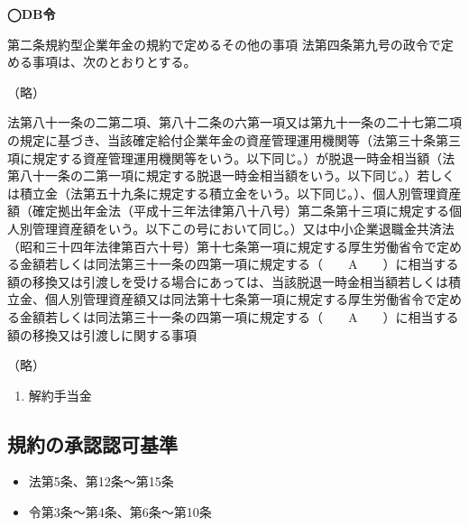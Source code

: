 \begin{fillblank}[年金2 \ 2018 \ 問題1(3)A]

  \noindent \textbf{◯DB令}
  \begin{lawstructure}
    \begin{lawarticle}{第二条}{規約型企業年金の規約で定めるその他の事項}
      法第四条第九号の政令で定める事項は、次のとおりとする。

      （略）

      法第八十一条の二第二項、第八十二条の六第一項又は第九十一条の二十七第二項の規定に基づき、当該確定給付企業年金の資産管理運用機関等（法第三十条第三項に規定する資産管理運用機関等をいう。以下同じ。）が脱退一時金相当額（法第八十一条の二第一項に規定する脱退一時金相当額をいう。以下同じ。）若しくは積立金（法第五十九条に規定する積立金をいう。以下同じ。）、個人別管理資産額（確定拠出年金法（平成十三年法律第八十八号）第二条第十三項に規定する個人別管理資産額をいう。以下この号において同じ。）又は中小企業退職金共済法（昭和三十四年法律第百六十号）第十七条第一項に規定する厚生労働省令で定める金額若しくは同法第三十一条の四第一項に規定する（　　A　　）に相当する額の移換又は引渡しを受ける場合にあっては、当該脱退一時金相当額若しくは積立金、個人別管理資産額又は同法第十七条第一項に規定する厚生労働省令で定める金額若しくは同法第三十一条の四第一項に規定する（　　A　　）に相当する額の移換又は引渡しに関する事項
      
      （略）
    \end{lawarticle}
  \end{lawstructure}

\end{fillblank}

\begin{answerbox}
 \begin{enumerate}[A:]
  \item 解約手当金
 \end{enumerate}
\end{answerbox}

\newpage

\subsection{規約の承認認可基準}



\begin{InyouJobunbox}
  \begin{itemize}
    \item 法第5条、第12条〜第15条
    \item 令第3条〜第4条、第6条〜第10条
  \end{itemize}
\end{InyouJobunbox}

